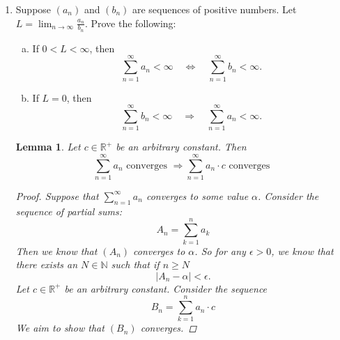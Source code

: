 \documentclass{amsart}
\newtheorem{lemma}[theorem]{Lemma}
\begin{document}
\begin{enumerate}[1.]
\newpage
\item Suppose $(a_n)$ and $(b_n)$ are sequences of positive numbers. Let $\displaystyle L= \lim_{n\to\infty}\frac{a_n}{b_n}$. Prove the following:
\begin{enumerate}[(a)]
\item If $0<L<\infty$, then 
\[ \sum_{n=1}^{\infty} a_n < \infty \quad \Leftrightarrow \quad \sum_{n=1}^{\infty} b_n < \infty.\]
\item If $L=0$, then 
\[ \sum_{n=1}^{\infty} b_n < \infty \quad \Rightarrow \quad \sum_{n=1}^{\infty} a_n < \infty.\]
\end{enumerate}
\begin{lemma}
    Let $c \in \mathbb{R^+}$ be an arbitrary constant. Then
    \[
        \sum_{n=1}^{\infty} a_n \text{ converges }\Rightarrow \sum_{n=1}^{\infty} a_n\cdot c \text{ converges }   
    \]
    \begin{proof}
        Suppose that $\sum_{n=1}^{\infty} a_n$ converges to some value $\alpha$. Consider the sequence of partial sums: 
        \[
            A_n = \sum_{k=1}^{n} a_k
        \]
        Then we know that $(A_n)$ converges to $\alpha$. So for any $\epsilon > 0$, we know that there exists an $N \in \mathbb{N}$
        such that if $n \geq N$
        \[
            |A_n - \alpha| < \epsilon.    
        \]
        Let $c \in \mathbb{R^+}$ be an arbitrary constant. Consider the sequence 
        \[
            B_n = \sum_{k=1}^n a_n\cdot c    
        \]
        We aim to show that $(B_n)$ converges. 


\end{proof}
\end{lemma}
\end{enumerate}
\end{document}
